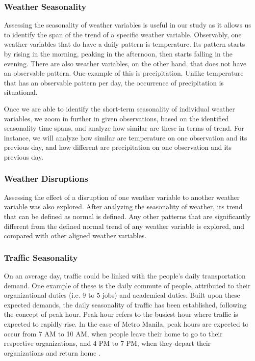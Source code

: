 \subsubsection{Weather Seasonality}
Assessing the seasonality of weather variables is useful in our study as it allows us to identify the span of the trend of a specific weather variable. Observably, one weather variables that do have a daily pattern is temperature. Its pattern starts by rising in the morning, peaking in the afternoon, then starts falling in the evening. There are also weather variables, on the other hand, that does not have an observable pattern. One example of this is precipitation. Unlike temperature that has an observable pattern per day, the occurrence of precipitation is situational. 

Once we are able to identify the short-term seasonality of individual weather variables, we zoom in further in given observations, based on the identified seasonality time spans, and analyze how similar are these in terms of trend. For instance, we will analyze how similar are temperature on one observation and its previous day, and how different are precipitation on one observation and its previous day.

\subsubsection{Weather Disruptions}
Assessing the effect of a disruption of one weather variable to another weather variable was also explored. After analyzing the seasonality of weather, its trend that can be defined as normal is defined. Any other patterns that are significantly different from the defined normal trend of any weather variable is explored, and compared with other aligned weather variables. 

\subsubsection{Traffic Seasonality}
On an average day, traffic could be linked with the people's daily transportation demand. One example of these is the daily commute of people, attributed to their organizational duties (i.e. 9 to 5 jobs) and academical duties. Built upon these expected demands, the daily seasonality of traffic has been established, following the concept of peak hour. Peak hour refers to the busiest hour where traffic is expected to rapidly rise. In the case of Metro Manila, peak hours are expected to occur from 7 AM to 10 AM, when people leave their home to go to their respective organizations, and 4 PM to 7 PM, when they depart their organizations and return home \cite{metro_manila_peak_hour}.

